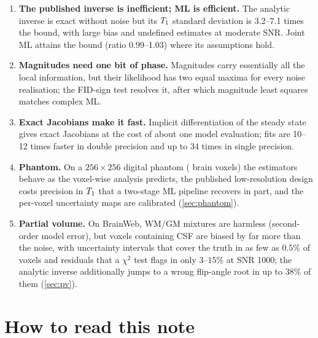 \begin{enumerate}
  $\alpha_2=360^\circ+x$ inside the physiological range; complex data with a shared phase
  exclude it but admit one with $\alpha_2>540^\circ$, removed by the range assumption
  $\Bone<1.64$ (\cref{prop:equiv}).
\item \textbf{The published inverse is inefficient; ML is efficient.} The analytic inverse
  is exact without noise but its $T_1$ standard deviation is 3.2--7.1 times the bound, with
  large bias and undefined estimates at moderate SNR. Joint ML attains the bound (ratio
  0.99--1.03) where its assumptions hold.
\item \textbf{Magnitudes need one bit of phase.} Magnitudes carry essentially all the local
  information, but their likelihood has two equal maxima for every noise realisation; the
  FID-sign test resolves it, after which magnitude least squares matches complex ML.
\item \textbf{Exact Jacobians make it fast.} Implicit differentiation of the steady state
  gives exact Jacobians at the cost of about one model evaluation; fits are 10--12 times
  faster in double precision and up to 34 times in single precision.
\item \textbf{Phantom.} On a $256\times256$ digital phantom (\Voxels{} brain voxels) the
  estimators behave as the voxel-wise analysis predicts, the published low-resolution design
  costs precision in $T_1$ that a two-stage ML pipeline recovers in part, and the per-voxel
  uncertainty maps are calibrated (\cref{sec:phantom}).
\item \textbf{Partial volume.} On BrainWeb, WM/GM mixtures are harmless (second-order model
  error), but voxels containing CSF are biased by far more than the noise, with uncertainty
  intervals that cover the truth in as few as $0.5\%$ of voxels and residuals that a $\chi^2$ test
  flags in only $3$--$15\%$ at SNR 1000; the analytic inverse additionally jumps to a wrong flip-angle
  root in up to $38\%$ of them (\cref{sec:pv}).
\end{enumerate}

\section*{How to read this note}

